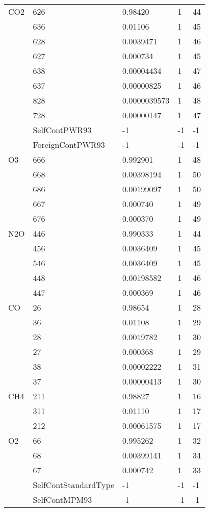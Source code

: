 \begin{longtable}{lllll}
\hline                  
  CO2& 626&  0.98420&  1&44\\
     & 636&  0.01106&  1&45\\
     & 628&  0.0039471&  1&46\\
     & 627&  0.000734&  1&45\\
     & 638&  0.00004434&  1&47\\
     & 637&  0.00000825&  1&46\\
     & 828&  0.0000039573&  1&48\\
     & 728&  0.00000147&  1&47\\
     &SelfContPWR93&        -1  &-1     &-1     \\
     &ForeignContPWR93&     -1  &-1     &-1     \\
\hline                  
  O3& 666&   0.992901&  1&48\\
    & 668&   0.00398194&  1&50\\
    & 686&   0.00199097&  1&50\\
    & 667&   0.000740&  1&49\\
    & 676&   0.000370&  1&49\\
\hline                  
  N2O& 446&  0.990333&  1&44\\
     & 456&  0.0036409&  1&45\\
     & 546&  0.0036409&  1&45\\
     & 448&  0.00198582&  1&46\\
     & 447&  0.000369&  1&46\\
\hline                   
  CO& 26&  0.98654&  1&28\\
    & 36&  0.01108&  1&29\\
    & 28&  0.0019782&  1&30\\
    & 27&  0.000368&  1&29\\
    & 38&  0.00002222&  1&31\\
    & 37&  0.00000413&  1&30\\
\hline                  
  CH4& 211&  0.98827&  1&16\\
     & 311&  0.01110&  1&17\\
     & 212&  0.00061575&  1&17\\
\hline                  
  O2& 66&  0.995262&  1&32\\
    & 68&  0.00399141&  1&34\\
    & 67&  0.000742&  1&33\\
    &SelfContStandardType&      -1      &-1     &-1     \\
    &SelfContMPM93&             -1      &-1     &-1     \\

\end{longtable}
